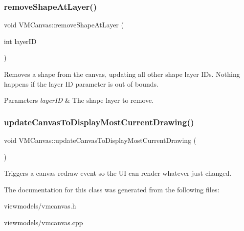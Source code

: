 \subsubsection{\texorpdfstring{removeShapeAtLayer()}{removeShapeAtLayer()}}
{\footnotesize\ttfamily void V\+M\+Canvas\+::remove\+Shape\+At\+Layer (\begin{DoxyParamCaption}\item[{int}]{layer\+ID }\end{DoxyParamCaption})}



Removes a shape from the canvas, updating all other shape layer I\+Ds. Nothing happens if the layer ID parameter is out of bounds. 


\begin{DoxyParams}{Parameters}
{\em layer\+ID} & The shape layer to remove. \\
\hline
\end{DoxyParams}
\mbox{\label{class_v_m_canvas_a66bc48cf35def60c67cb5ba06d31f2a8}} 
\subsubsection{\texorpdfstring{updateCanvasToDisplayMostCurrentDrawing()}{updateCanvasToDisplayMostCurrentDrawing()}}
{\footnotesize\ttfamily void V\+M\+Canvas\+::update\+Canvas\+To\+Display\+Most\+Current\+Drawing (\begin{DoxyParamCaption}{ }\end{DoxyParamCaption})}



Triggers a canvas redraw event so the UI can render whatever just changed. 



The documentation for this class was generated from the following files\+:\begin{DoxyCompactItemize}
\item 
viewmodels/vmcanvas.\+h\item 
viewmodels/vmcanvas.\+cpp\end{DoxyCompactItemize}

